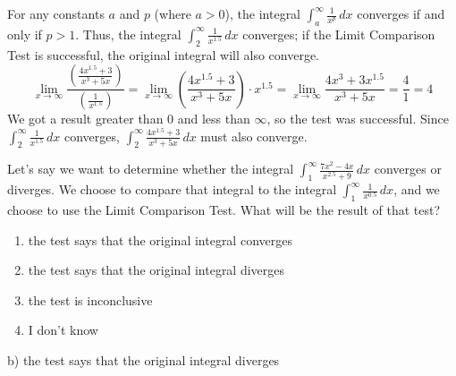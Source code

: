 \documentclass[addpoints,12pt,answers]{exam}
\begin{document}
\begin{questions}
\begin{solution}
    For any constants $a$ and $p$ (where $a>0$), the integral $\displaystyle\int_a^{\infty}\frac{1}{x^p}\,dx$ converges if and only if $p>1$. Thus, the integral $\displaystyle\int_2^\infty\frac{1}{x^{1.5}}\,dx$ converges; if the Limit Comparison Test is successful, the original integral will also converge.
    $$\lim_{x\to\infty}\frac{\left(\frac{4x^{1.5}+3}{x^3+5x}\right)}{\left(\frac{1}{x^{1.5}}\right)}=\lim_{x\to\infty}\left(\frac{4x^{1.5}+3}{x^3+5x}\right)\cdot x^{1.5}=\lim_{x\to\infty}\frac{4x^3+3x^{1.5}}{x^3+5x}=\frac{4}{1}=4$$
    We got a result greater than 0 and less than $\infty$, so the test was successful. Since $\displaystyle\int_2^\infty\frac{1}{x^{1.5}}\,dx$ converges, $\displaystyle\int_2^\infty\frac{4x^{1.5}+3}{x^3+5x}\,dx$ must also converge.
  \end{solution}
  \newpage
  \question
  Let's say we want to determine whether the integral $\displaystyle\int_1^\infty\frac{7x^2-4x}{x^{2.5}+9}\,dx$ converges or diverges. We choose to compare that integral to the integral $\displaystyle\int_1^\infty\frac{1}{x^{0.5}}\,dx$, and we choose to use the Limit Comparison Test. What will be the result of that test?
  \begin{enumerate}[label=\alph*)]
    \item
    the test says that the original integral converges
    \item
    the test says that the original integral diverges
    \item
    the test is inconclusive
    \item
    I don't know
  \end{enumerate}
  \begin{solution}
    b) the test says that the original integral diverges
    

\end{solution}
\end{questions}
\end{document}
